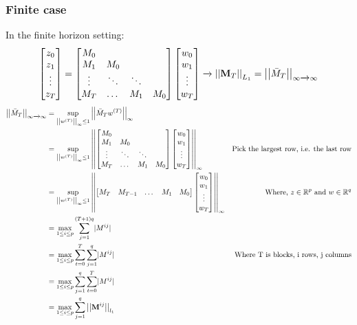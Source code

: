 \documentclass{article}[12pt]
\newcommand{\norm}[1]{\left|\left|#1\right|\right|}
\begin{document}
\subsubsection{Finite case}
In the finite horizon setting:
    \begin{align*}
        \begin{bmatrix}z_0\\z_1\\\vdots\\z_T\end{bmatrix} =  
        \begin{bmatrix}M_0\\M_1 & M_0\\ \vdots &\ddots&\ddots\\M_T&\dots&M_1&M_0 \end{bmatrix}\begin{bmatrix}w_0\\w_1\\\vdots\\w_T\end{bmatrix} \xrightarrow{} \norm{\textbf{M}_T}_{L_1} = \norm{\Bar{M}_T}_{\infty\xrightarrow{}\infty}
    \end{align*}
    \begin{align*}
        \norm{\Bar{M}_T}_{\infty\xrightarrow{}\infty} &= \sup_{\norm{w^{(T)}}_{\infty}\leq 1}\norm{\bar{M}_T w^{(T)}}_{\infty}\\
        &=\sup_{\norm{w^{(T)}}_{\infty}\leq 1}\norm{\begin{bmatrix}M_0\\M_1 & M_0\\ \vdots &\ddots&\ddots\\M_T&\dots&M_1&M_0\end{bmatrix}
        \begin{bmatrix}w_0\\w_1\\\vdots\\w_T\end{bmatrix}}_{\infty} & \text{Pick the largest row, i.e. the last row}\\
        &=\sup_{\norm{w^{(T)}}_{\infty}\leq 1}\norm{\begin{bmatrix}M_T & M_{T-1}&\dots& M_1& M_0\end{bmatrix}\begin{bmatrix}w_0\\w_1\\\vdots\\w_T\end{bmatrix}}_{\infty} & \text{Where, $z\in \mathbb{R}^p$ and $w\in \mathbb{R}^q$}\\
        &= \max_{1\leq i \leq p}\sum^{(T+1)q}_{j=1}\lvert M^{ij}\rvert\\
        &= \max_{1\leq i \leq p}\sum^T_{t=0}\sum^q_{j=1}\lvert M^{ij}\rvert & \text{Where T is blocks, i rows, j columns}\\
        &= \max_{1\leq i \leq p}\sum^q_{j=1}\sum^T_{t=0}\lvert M^{ij}\rvert\\
        &=\max_{1\leq i\leq p}\sum_{j=1}^q \norm{\textbf{M}^{ij}}_{l_1}\\
    \end{align*}
\end{document}
